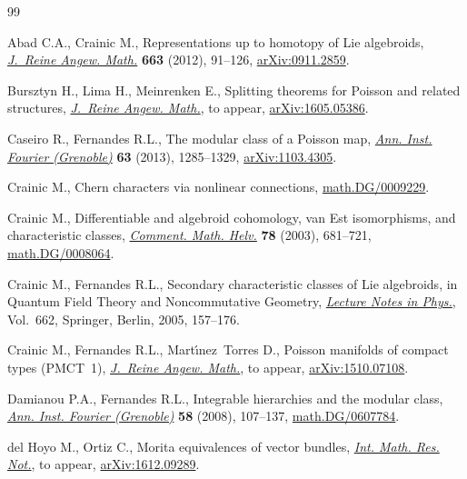 \documentclass[pdftex]{sigma}
\numberwithin{equation}{section}
\newcommand{\8}{\infty}
\begin{document}
\begin{thebibliography}{99}
\footnotesize\itemsep=0pt

Abad C.A., Crainic M., Representations up to homotopy of {L}ie algebroids,
 \href{https://doi.org/10.1515/CRELLE.2011.095}{\textit{J.~Reine Angew. Math.}} \textbf{663} (2012), 91--126,
 \href{https://arxiv.org/abs/0911.2859}{arXiv:0911.2859}.

Bursztyn H., Lima H., Meinrenken E., Splitting theorems for {P}oisson and
 related structures, \href{https://doi.org/10.1515/crelle-2017-001}{\textit{J.~Reine Angew. Math.}}, {t}o appear,
 \href{https://arxiv.org/abs/1605.05386}{arXiv:1605.05386}.

Caseiro R., Fernandes R.L., The modular class of a {P}oisson map, \href{https://doi.org/10.5802/aif.2804}{\textit{Ann.
 Inst. Fourier (Grenoble)}} \textbf{63} (2013), 1285--1329, \href{https://arxiv.org/abs/1103.4305}{arXiv:1103.4305}.

Crainic M., Chern characters via nonlinear connections,
 \href{https://arxiv.org/abs/math.DG/0009229}{math.DG/0009229}.

Crainic M., Differentiable and algebroid cohomology, van {E}st isomorphisms,
 and characteristic classes, \href{https://doi.org/10.1007/s00014-001-0766-9}{\textit{Comment. Math. Helv.}} \textbf{78} (2003),
 681--721, \href{https://arxiv.org/abs/math.DG/0008064}{math.DG/0008064}.

Crainic M., Fernandes R.L., Secondary characteristic classes of {L}ie
 algebroids, in Quantum Field Theory and Noncommutative Geometry,
 \href{https://doi.org/10.1007/11342786_9}{\textit{Lecture Notes in Phys.}}, Vol.~662, Springer, Berlin, 2005, 157--176.

Crainic M., Fernandes R.L., Mart\'{\i}nez~Torres D., Poisson manifolds of
 compact types ({PMCT}~1), \href{https://doi.org/10.1515/crelle-2017-0006}{\textit{J.~Reine Angew. Math.}}, {t}o appear,
 \href{https://arxiv.org/abs/1510.07108}{arXiv:1510.07108}.

Damianou P.A., Fernandes R.L., Integrable hierarchies and the modular class,
 \href{https://doi.org/10.5802/aif.2346}{\textit{Ann. Inst. Fourier (Grenoble)}} \textbf{58} (2008), 107--137,
 \href{https://arxiv.org/abs/math.DG/0607784}{math.DG/0607784}.

del Hoyo M., Ortiz C., Morita equivalences of vector bundles, \href{https://doi.org/10.1093/imrn/rny149}{\textit{Int.
 Math. Res. Not.}}, {t}o appear, \href{https://arxiv.org/abs/1612.09289}{arXiv:1612.09289}.


\end{thebibliography}
\end{document}
